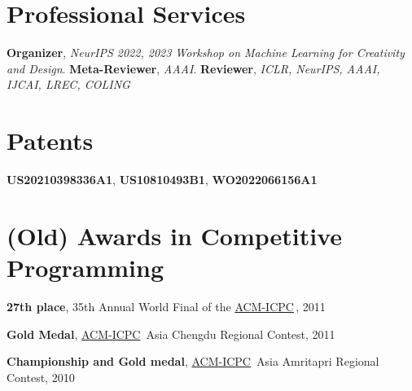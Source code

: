 \documentclass[line,margin]{cv}
\newcommand{\myemph}{\textbf}
\newcommand{\ICPC}{\href{http://icpc.baylor.edu/}{ACM-ICPC}}
\begin{document}
\begin{resume}
\section{Professional Services }
  \myemph{Organizer}, \emph{NeurIPS 2022, 2023 Workshop on Machine Learning for Creativity and Design}. \myemph{Meta-Reviewer}, \emph{AAAI}. \myemph{Reviewer}, \emph{ICLR, NeurIPS, AAAI, IJCAI, LREC, COLING}

\section{Patents}

  \myemph{US20210398336A1}, \myemph{US10810493B1}, \myemph{WO2022066156A1}

\section{(Old) Awards in Competitive Programming}
  \myemph{27th place}, 35th Annual World Final of the \ICPC \,, 2011

  \myemph{Gold Medal}, \ICPC\ Asia Chengdu Regional Contest, 2011

  \myemph{Championship and Gold medal}, \ICPC\ Asia Amritapri Regional Contest, 2010

\end{resume}
\end{document}
